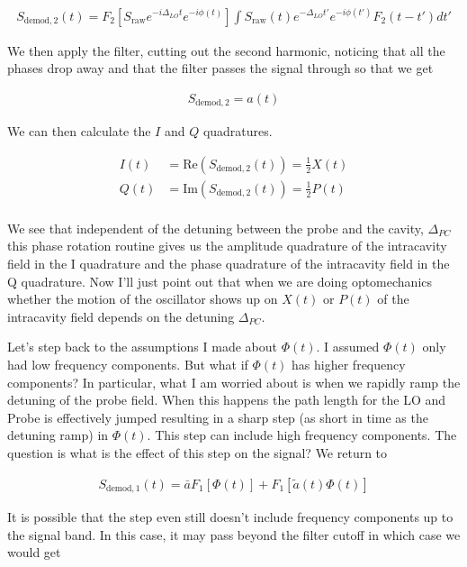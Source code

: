 \documentclass[12pt]{article}
\begin{document}
\begin{align}
S_{\text{demod},2}(t) = F_2\left[S_{\text{raw}}e^{-i\Delta_{LO} t}e^{-i\phi(t)} \right] \int S_{\text{raw}}(t) e^{-\Delta_{LO} t'} e^{-i\phi(t')} F_2(t-t') dt'
\end{align}

We then apply the filter, cutting out the second harmonic, noticing that all the phases drop away and that the filter passes the signal through so that we get

\begin{align}
S_{\text{demod},2} = a(t)
\end{align}

We can then calculate the $I$ and $Q$ quadratures.

\begin{align}
I(t) &= \text{Re}(S_{\text{demod},2}(t)) = \frac{1}{2} X(t)\\
Q(t) &= \text{Im}(S_{\text{demod},2}(t)) = \frac{1}{2} P(t)\\
\end{align}

We see that independent of the detuning between the probe and the cavity, $\Delta_{PC}$ this phase rotation routine gives us the amplitude quadrature of the intracavity field in the I quadrature and the phase quadrature of the intracavity field in the Q quadrature. Now I'll just point out that when we are doing optomechanics whether the motion of the oscillator shows up on $X(t)$ or $P(t)$ of the intracavity field depends on the detuning $\Delta_{PC}$.


Let's step back to the assumptions I made about $\Phi(t)$. I assumed $\Phi(t)$ only had low frequency components. But what if $\Phi(t)$ has higher frequency components? In particular, what I am worried about is when we rapidly ramp the detuning of the probe field. When this happens the path length for the LO and Probe is effectively jumped resulting in a sharp step (as short in time as the detuning ramp) in $\Phi(t)$. This step can include high frequency components. The question is what is the effect of this step on the signal? We return to

\begin{align}
S_{\text{demod},1}(t) = \bar{a}F_1\left[\Phi(t)\right] + F_1\left[\tilde{a}(t)\Phi(t) \right]
\end{align}

It is possible that the step even still doesn't include frequency components up to the signal band. In this case, it may pass beyond the filter cutoff in which case we would get
\end{document}
